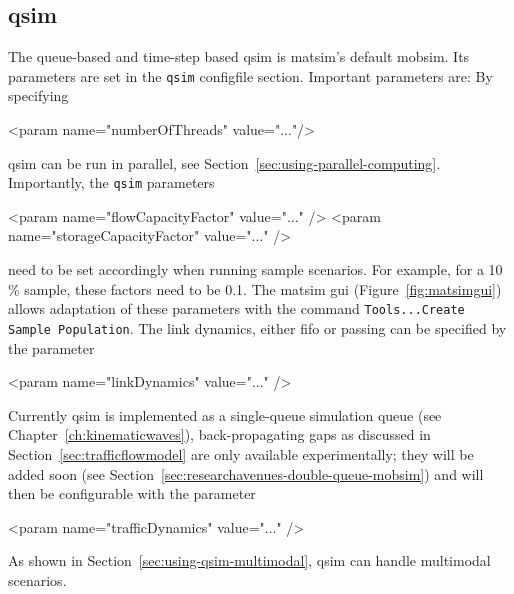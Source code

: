 \subsection{\protect\gls{qsim}}
\label{sec:using-qsim}
The queue-based and time-step based \gls{qsim} \citep[][]{Gawron_IJMPC_1998,SimonEtAl_IJMPC_1999,CetinEtAl_STRC_2003,Dobler_TechRep_IVT_2011, Dobler_STRC_2010} is \gls{matsim}'s default \gls{mobsim}. 
Its parameters are set in the \lstinline|qsim| \gls{configfile} section. Important parameters are:
By specifying
\begin{xml}
   <param name="numberOfThreads" value="..."/>
\end{xml}
\gls{qsim} can be run in parallel, see Section~\ref{sec:using-parallel-computing}. 
%
Importantly, the \lstinline{qsim} parameters
\begin{xml}
    <param name="flowCapacityFactor" value="..." />
    <param name="storageCapacityFactor" value="..." />
\end{xml}
need to be set accordingly when running sample scenarios. For example, for a 10\,\% sample, these factors need to be 0.1. The \gls{matsim} \gls{gui} (Figure~\ref{fig:matsimgui}) allows adaptation of these parameters with the command \lstinline|Tools...Create Sample Population|.
%
The link dynamics, either \gls{fifo} or passing can be specified by the parameter 
\begin{xml}
   <param name="linkDynamics" value="..." />
\end{xml}
%
Currently \gls{qsim} is implemented as a single-queue simulation queue (see Chapter~\ref{ch:kinematicwaves}), \ie back-propagating gaps as discussed in Section~\ref{sec:trafficflowmodel} are only available experimentally; 
they will be added soon (see Section~\ref{sec:researchavenues-double-queue-mobsim}) and will then be configurable with the parameter
\begin{xml}
   <param name="trafficDynamics" value="..." />
\end{xml}
%
As shown in Section~\ref{sec:using-qsim-multimodal}, \gls{qsim} can handle \gls{multimodal} scenarios. %

